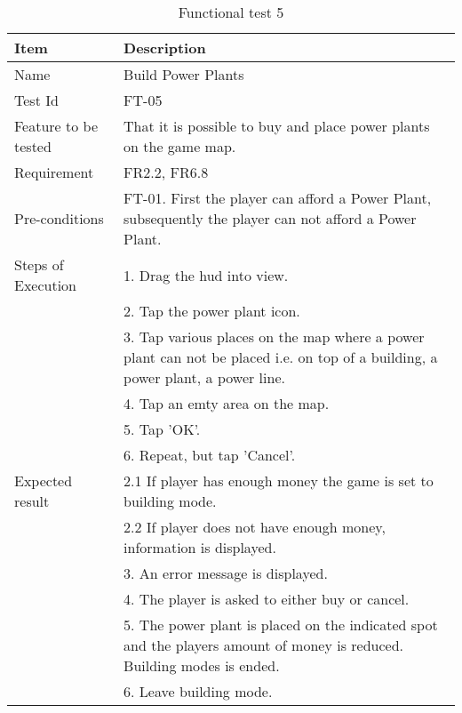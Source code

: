 \begin{table}[H]
\centering
	\begin{tabular}{ l | p{8cm} }
		\hline
		{\bf Item} & {\bf Description} \\ \hline
		Name & Build Power Plants \\ 
		Test Id & FT-05 \\ 
		Feature to be tested & That it is possible to buy and place power plants on the game map. \\ 
		Requirement & FR2.2, FR6.8 \\ 
		Pre-conditions & FT-01. First the player can afford a Power Plant, subsequently the player can not afford a Power Plant. \\
		Steps of Execution & 1. Drag the hud into view. \\ 
		& 2. Tap the power plant icon. \\
		& 3. Tap various places on the map where a power plant can not be placed i.e. on top of a building, a power plant, a power line. \\
		& 4. Tap an emty area on the map. \\
		& 5. Tap 'OK'. \\
		& 6. Repeat, but tap 'Cancel'. \\
		Expected result & 2.1 If player has enough money the game is set to building mode. \\
		& 2.2 If player does not have enough money, information is displayed. \\
		& 3. An error message is displayed. \\ 
		& 4. The player is asked to either buy or cancel. \\
		& 5. The power plant is placed on the indicated spot and the players amount of money is reduced. Building modes is ended. \\
		& 6. Leave building mode. \\
	\end{tabular}
	\caption{Functional test 5}
\end{table}

